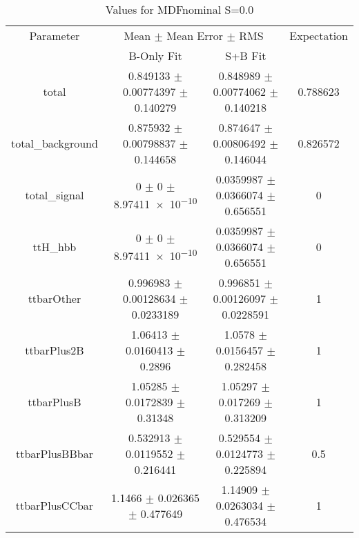 \begin{table}
\centering
\caption{Values for MDFnominal S=0.0}
\begin{tabular}{cccc}
\toprule
Parameter & \multicolumn{2}{c}{Mean $\pm$ Mean Error $\pm$ RMS} & Expectation\\
 & B-Only Fit & S+B Fit & \\
\midrule
total & \num{0.849133} $\pm$ \num{0.00774397} $\pm$ \num{0.140279} & \num{0.848989} $\pm$ \num{0.00774062} $\pm$ \num{0.140218} & \num{0.788623}\\
total\_background & \num{0.875932} $\pm$ \num{0.00798837} $\pm$ \num{0.144658} & \num{0.874647} $\pm$ \num{0.00806492} $\pm$ \num{0.146044} & \num{0.826572}\\
total\_signal & \num{0} $\pm$ \num{0} $\pm$ \num{8.97411e-10} & \num{0.0359987} $\pm$ \num{0.0366074} $\pm$ \num{0.656551} & \num{0}\\
ttH\_hbb & \num{0} $\pm$ \num{0} $\pm$ \num{8.97411e-10} & \num{0.0359987} $\pm$ \num{0.0366074} $\pm$ \num{0.656551} & \num{0}\\
ttbarOther & \num{0.996983} $\pm$ \num{0.00128634} $\pm$ \num{0.0233189} & \num{0.996851} $\pm$ \num{0.00126097} $\pm$ \num{0.0228591} & \num{1}\\
ttbarPlus2B & \num{1.06413} $\pm$ \num{0.0160413} $\pm$ \num{0.2896} & \num{1.0578} $\pm$ \num{0.0156457} $\pm$ \num{0.282458} & \num{1}\\
ttbarPlusB & \num{1.05285} $\pm$ \num{0.0172839} $\pm$ \num{0.31348} & \num{1.05297} $\pm$ \num{0.017269} $\pm$ \num{0.313209} & \num{1}\\
ttbarPlusBBbar & \num{0.532913} $\pm$ \num{0.0119552} $\pm$ \num{0.216441} & \num{0.529554} $\pm$ \num{0.0124773} $\pm$ \num{0.225894} & \num{0.5}\\
ttbarPlusCCbar & \num{1.1466} $\pm$ \num{0.026365} $\pm$ \num{0.477649} & \num{1.14909} $\pm$ \num{0.0263034} $\pm$ \num{0.476534} & \num{1}\\
\bottomrule
\end{tabular}
\end{table}